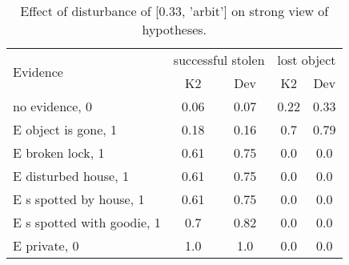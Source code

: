 \begin{table}\begin{tabular}{l|cc|cc}\toprule\multirow{2}{*}{Evidence} & \multicolumn{2}{c}{successful stolen}& \multicolumn{2}{c}{lost object}\\& {K2} & {Dev}& {K2} & {Dev}\\\midrule
no evidence, 0 & 0.06&0.07&\cellcolor{Bittersweet}0.22&\cellcolor{Bittersweet}0.33\\E object is gone, 1 & 0.18&0.16&\cellcolor{Bittersweet}0.7&\cellcolor{Bittersweet}0.79\\E broken lock, 1 & \cellcolor{Bittersweet}0.61&\cellcolor{Bittersweet}0.75&0.0&0.0\\E disturbed house, 1 & \cellcolor{Bittersweet}0.61&\cellcolor{Bittersweet}0.75&0.0&0.0\\E s spotted by house, 1 & \cellcolor{Bittersweet}0.61&\cellcolor{Bittersweet}0.75&0.0&0.0\\E s spotted with goodie, 1 & \cellcolor{Bittersweet}0.7&\cellcolor{Bittersweet}0.82&0.0&0.0\\E private, 0 & 1.0&1.0&0.0&0.0\\\bottomrule\end{tabular}\caption{Effect of disturbance of [0.33, 'arbit'] on strong view of hypotheses.}\end{table}